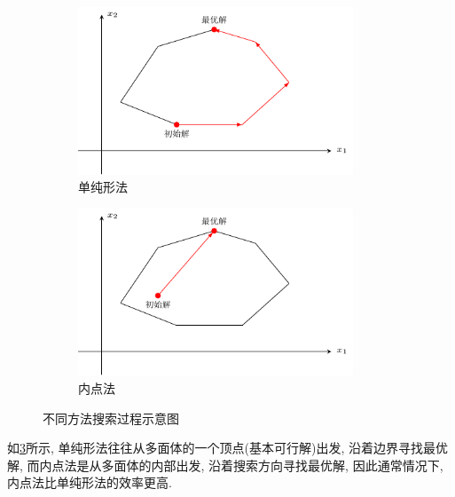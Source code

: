 \begin{figure}[ht]
    \centering
    \begin{subfigure}[c]{0.45\textwidth}
        \centering
        \includegraphics[width=0.9\textwidth]{figures/17-2.pdf}
        \caption{单纯形法}
        \label{figure:17-2}
    \end{subfigure}
    \begin{subfigure}[c]{0.45\textwidth}
        \centering
        \includegraphics[width=0.9\textwidth]{figures/17-3.pdf}
        \caption{内点法}
        \label{figure:17-3}
    \end{subfigure}
    \caption{不同方法搜索过程示意图}
    \label{figure:search schematic}
\end{figure}

如\cref{figure:search schematic}所示, 单纯形法往往从多面体的一个顶点(基本可行解)出发, 沿着边界寻找最优解, 而内点法是从多面体的内部出发, 沿着搜索方向寻找最优解, 因此通常情况下, 内点法比单纯形法的效率更高.
